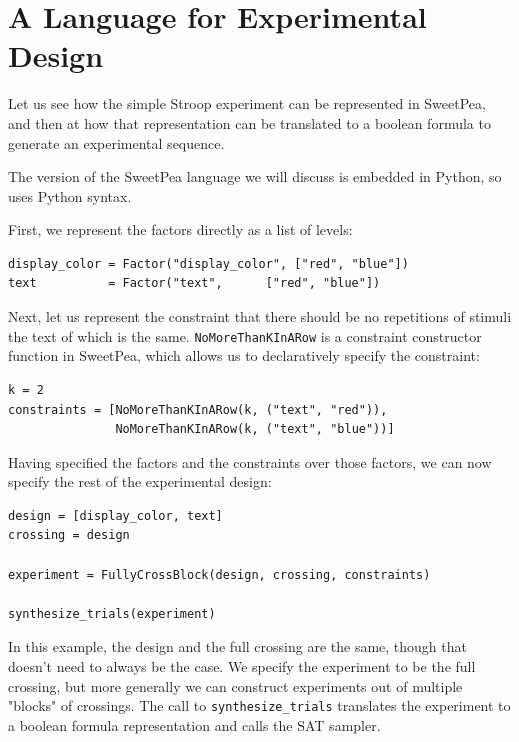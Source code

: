 \section{A Language for Experimental Design}

Let us see how the simple Stroop experiment can be represented in SweetPea, and then at how that representation can be translated to a boolean formula to generate an experimental sequence.

The version of the SweetPea language we will discuss is embedded in Python, so uses Python syntax.

First, we represent the factors directly as a list of levels:

\begin{verbatim}
display_color = Factor("display_color", ["red", "blue"])
text          = Factor("text",      ["red", "blue"])
\end{verbatim}

Next, let us represent the constraint that there should be no repetitions of stimuli the text of which is the same. \texttt{NoMoreThanKInARow} is a constraint constructor function in SweetPea, which allows us to declaratively specify the constraint:

\begin{verbatim}
k = 2
constraints = [NoMoreThanKInARow(k, ("text", "red")),
               NoMoreThanKInARow(k, ("text", "blue"))]
\end{verbatim}

Having specified the factors and the constraints over those factors, we can now specify the rest of the experimental design:

\begin{verbatim}
design = [display_color, text]
crossing = design

experiment = FullyCrossBlock(design, crossing, constraints)

synthesize_trials(experiment)
\end{verbatim}

In this example, the design and the full crossing are the same, though that doesn't need to always be the case. We specify the experiment to be the full crossing, but more generally we can construct experiments out of multiple "blocks" of crossings. The call to \texttt{synthesize\_trials} translates the experiment to a boolean formula representation and calls the SAT sampler.

